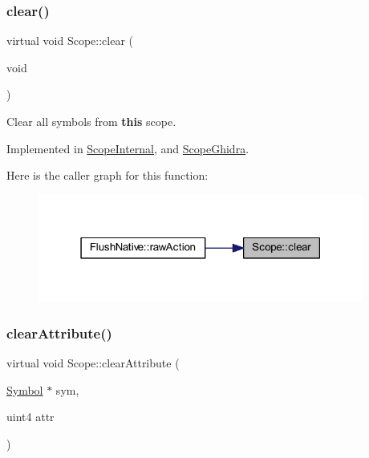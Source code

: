 \subsubsection{\texorpdfstring{clear()}{clear()}}
{\footnotesize\ttfamily virtual void Scope\+::clear (\begin{DoxyParamCaption}\item[{void}]{ }\end{DoxyParamCaption})\hspace{0.3cm}{\ttfamily [pure virtual]}}



Clear all symbols from {\bfseries{this}} scope. 



Implemented in \mbox{\hyperlink{class_scope_internal_a3d5c9c8e68da7f36ae7e0e228b4734d2}{Scope\+Internal}}, and \mbox{\hyperlink{class_scope_ghidra_a2ebfecc6211081f8f2411c006cc867de}{Scope\+Ghidra}}.

Here is the caller graph for this function\+:
\nopagebreak
\begin{figure}[H]
\begin{center}
\leavevmode
\includegraphics[width=303pt]{class_scope_a9bfa2b0a98ba3ceeafd5a1e7ad2e2c21_icgraph}
\end{center}
\end{figure}
\mbox{\label{class_scope_afb57165fd0d3c182e18ea24e7231975d}} 
\subsubsection{\texorpdfstring{clearAttribute()}{clearAttribute()}}
{\footnotesize\ttfamily virtual void Scope\+::clear\+Attribute (\begin{DoxyParamCaption}\item[{\mbox{\hyperlink{class_symbol}{Symbol}} $\ast$}]{sym,  }\item[{uint4}]{attr }\end{DoxyParamCaption})\hspace{0.3cm}{\ttfamily [pure virtual]}}



